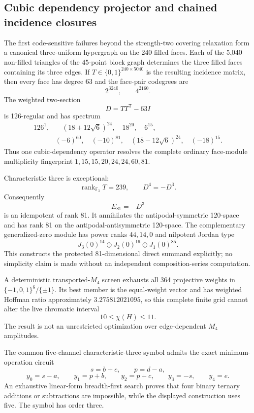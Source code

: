 \subsection{Cubic dependency projector and chained incidence closures}
\label{sec:bt3506-3519-chained-breakthrough}

The first code-sensitive failures beyond the strength-two covering relaxation form a canonical
three-uniform hypergraph on the 240 filled faces.  Each of the 5,040 non-filled triangles of
the 45-point block graph determines the three filled faces containing its three edges.  If
\(T\in\{0,1\}^{240\times5040}\) is the resulting incidence matrix, then every face has degree
63 and the face-pair codegrees are
\[
  2^{3240},\qquad 4^{2160}.
\]
The weighted two-section
\[
  D=TT^{\mathsf T}-63I
\]
is 126-regular and has spectrum
\[
\begin{split}
  126^1,&\quad(18+12\sqrt6)^{24},\quad18^{20},\quad6^{15},\\
  &(-6)^{60},\quad(-10)^{81},\quad(18-12\sqrt6)^{24},\quad(-18)^{15}.
\end{split}
\]
Thus one cubic-dependency operator resolves the complete ordinary face-module multiplicity
fingerprint \(1,15,15,20,24,24,60,81\).

Characteristic three is exceptional:
\[
  \operatorname{rank}_{\mathbb F_3}T=239,
  \qquad D^4=-D^3.
\]
Consequently
\[
  \boxed{E_{81}=-D^3}
\]
is an idempotent of rank 81.  It annihilates the antipodal-symmetric 120-space and has rank
81 on the antipodal-antisymmetric 120-space.  The complementary generalized-zero module has
power ranks \(44,14,0\) and nilpotent Jordan type
\[
  J_3(0)^{14}\oplus J_2(0)^{16}\oplus J_1(0)^{85}.
\]
This constructs the protected 81-dimensional direct summand explicitly; no simplicity claim is
made without an independent composition-series computation.

A deterministic transported-\(M_4\) screen exhausts all 364 projective weights in
\(\{-1,0,1\}^6/\{\pm1\}\).  Its best member is the equal-weight vector and has weighted
Hoffman ratio approximately \(3.275812021095\), so this complete finite grid cannot alter the
live chromatic interval
\[
  10\leq\chi(H)\leq11.
\]
The result is not an unrestricted optimization over edge-dependent \(M_4\) amplitudes.

The common five-channel characteristic-three symbol admits the exact minimum-operation circuit
\[
  s=b+c,\qquad p=d-a,
\]
\[
  y_0=s-a,\qquad y_1=p+b,\qquad y_2=p+c,\qquad y_3=-s,\qquad y_4=e.
\]
An exhaustive linear-form breadth-first search proves that four binary ternary additions or
subtractions are impossible, while the displayed construction uses five.  The symbol has order
three.

